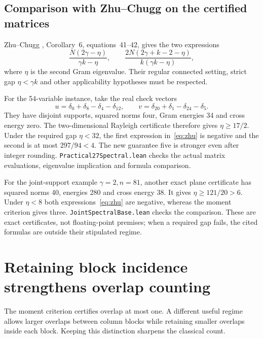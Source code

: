 \documentclass[11pt]{article}
\begin{document}
\subsection{Comparison with Zhu--Chugg on the certified matrices}
Zhu--Chugg \cite{ref3}, Corollary~6, equations~41--42, gives the two expressions
\begin{equation}\label{eq:zhu}
 \frac{N(2\gamma-\eta)}{\gamma k-\eta},\qquad
 \frac{2N(2\gamma+k-2-\eta)}{k(\gamma k-\eta)},
\end{equation}
where $\eta$ is the second Gram eigenvalue. Their regular connected setting,
strict gap $\eta<\gamma k$ and other applicability hypotheses must be respected.

For the 54-variable instance, take the real check vectors
\[
 u=\delta_0+\delta_8-\delta_4-\delta_{12},\qquad
 v=\delta_{20}+\delta_1-\delta_{24}-\delta_5.
\]
They have disjoint supports, squared norms four, Gram energies 34 and cross
energy zero. The two-dimensional Rayleigh certificate therefore gives
$\eta\ge17/2$. Under the required gap $\eta<32$, the first expression
in~\eqref{eq:zhu} is negative and the second is at most $297/94<4$.
The new guarantee five is stronger even after integer rounding.
\texttt{Practical27Spectral.lean} checks the actual matrix evaluations,
eigenvalue implication and formula comparison.

For the joint-support example $\gamma=2,n=81$, another exact plane certificate
has squared norms 40, energies 280 and cross energy 38. It gives
$\eta\ge121/20>6$. Under $\eta<8$ both expressions~\eqref{eq:zhu} are negative,
whereas the moment criterion gives three. \texttt{JointSpectralBase.lean}
checks the comparison. These are exact certificates, not floating-point
premises; when a required gap fails, the cited formulas are outside their
stipulated regime.

\section{Retaining block incidence strengthens overlap counting}
\label{sec:incidence}
The moment criterion certifies overlap at most one. A different useful regime
allows larger overlaps between column blocks while retaining smaller overlaps
inside each block. Keeping this distinction sharpens the classical count.
\end{document}
